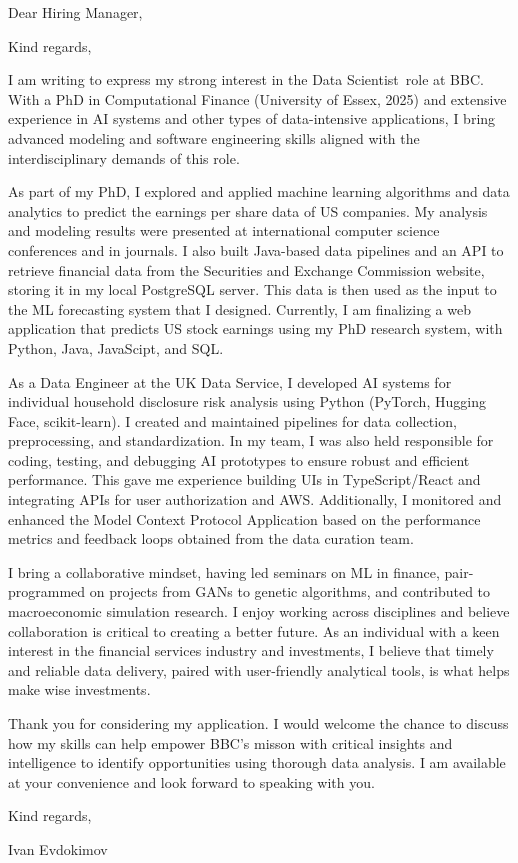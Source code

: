 \documentclass[11pt,a4paper,sans]{moderncv}
\newcommand{\positionname}{Data Scientist}
\newcommand{\companyfull}{ BBC }
\newcommand{\companyshort}{BBC}
\begin{document}
\date{\today}
\opening{Dear Hiring Manager,}
\closing{Kind regards,}

\makelettertitle

I am writing to express my strong interest in the \positionname~role at \companyshort. With a PhD in Computational Finance (University of Essex, 2025) and extensive experience in AI systems and other types of data-intensive applications, I bring advanced modeling and software engineering skills aligned with the interdisciplinary demands of this role.

As part of my PhD, I explored and applied machine learning algorithms and data analytics to predict the earnings per share data of US companies. My analysis and modeling results were presented at international computer science conferences and in journals. I also built Java-based data pipelines and an API to retrieve financial data from the Securities and Exchange Commission website, storing it in my local PostgreSQL server. This data is then used as the input to the ML forecasting system that I designed. Currently, I am finalizing a web application that predicts US stock earnings using my PhD research system, with Python, Java, JavaScipt, and SQL.

As a Data Engineer at the UK Data Service, I developed AI systems for individual household disclosure risk analysis using Python (PyTorch, Hugging Face, scikit-learn). I created and maintained pipelines for data collection, preprocessing, and standardization. In my team, I was also held responsible for coding, testing, and debugging AI prototypes to ensure robust and efficient performance. This gave me experience building UIs in TypeScript/React and integrating APIs for user authorization and AWS. Additionally, I monitored and enhanced the Model Context Protocol Application based on the performance metrics and feedback loops obtained from the data curation team.

I bring a collaborative mindset, having led seminars on ML in finance, pair-programmed on projects from GANs to genetic algorithms, and contributed to macroeconomic simulation research. I enjoy working across disciplines and believe collaboration is critical to creating a better future. As an individual with a keen interest in the financial services industry and investments, I believe that timely and reliable data delivery, paired with user-friendly analytical tools, is what helps make wise investments.

Thank you for considering my application. I would welcome the chance to discuss how my skills can help empower \companyshort's misson with critical insights and intelligence to identify opportunities using thorough data analysis. I am available at your convenience and look forward to speaking with you.

\vspace{0.25cm}
Kind regards,

Ivan Evdokimov
\end{document}

